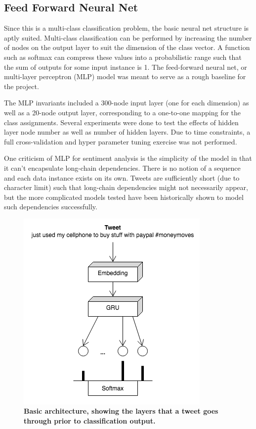 \documentclass[11pt,a4paper]{article}
\begin{document}
	\subsection{Feed Forward Neural Net}
	Since this is a multi-class classification problem, the basic neural net structure is aptly suited. Multi-class classification can be performed by increasing the number of nodes on the output layer to suit the dimension of the class vector. A function such as softmax can compress these values into a probabilistic range such that the sum of outputs for some input instance is 1. The feed-forward neural net, or multi-layer perceptron (MLP) model was meant to serve as a rough baseline for the project.
	\par
	The MLP invariants included a 300-node input layer (one for each dimension) as well as a 20-node output layer, corresponding to a one-to-one mapping for the class assignments. Several experiments were done to test the effects of hidden layer node number as well as number of hidden layers. Due to time constraints, a full cross-validation and hyper parameter tuning exercise was not performed. 
	\par
	One criticism of MLP for sentiment analysis is the simplicity of the model in that it can’t encapsulate long-chain dependencies. There is no notion of a sequence and each data instance exists on its own. Tweets are sufficiently short (due to character limit) such that long-chain dependencies might not necessarily appear, but the more complicated models tested have been historically shown to model such dependencies successfully. 
	
	\begin{figure}[H]
		\hspace*{-1.3cm}
		\centering\includegraphics[scale=0.7]{modelgru} 
		\caption{\textbf{ Basic architecture, showing the layers that a tweet goes through prior to classification output.}}
	\end{figure}
	
\end{document}
